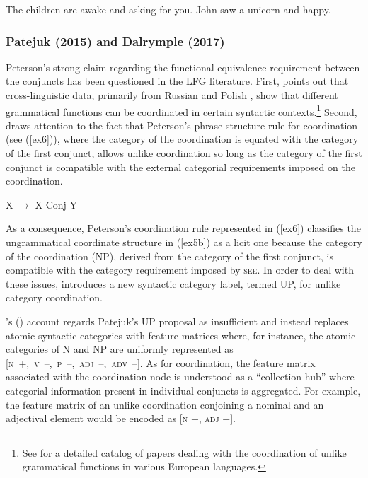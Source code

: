 \pex
\label{ex5}
\a\label{ex5a}The children are awake and asking for you. 
\a\label{ex5b}\ljudge{*}John saw a unicorn and happy. 
\xe

\subsubsection{Patejuk (2015) and Dalrymple (2017)}
Peterson's strong claim regarding the functional equivalence requirement between the conjuncts has been questioned in the LFG literature. First, \citet[ch.\ 5]{pat:15} points out that cross-linguistic data, primarily from Russian \citep{chaves-paperno:2007} and Polish \citep[][pp.\ 2200--2202]{pat:prz:12b}, show that different grammatical functions can be coordinated in certain syntactic contexts.\footnote{See \citet[ch.5]{pat:15} for a detailed catalog of papers dealing with the coordination of unlike grammatical functions in various European languages.} Second, \citet{Dalrymple2017} draws attention to the fact that Peterson's phrase-structure rule for coordination (see (\ref{ex6})), where the category of the coordination is equated with the category of the first conjunct, allows unlike coordination so long as the category of the first conjunct is compatible with the external categorial requirements imposed on the coordination.

\pex
\label{ex6}
X \hspace{5pt} $\longrightarrow$ \hspace{5pt} X \hspace{5pt} Conj \hspace{5pt} Y 
\xe

\noindent As a consequence, Peterson's coordination rule represented in (\ref{ex6}) classifies the ungrammatical coordinate structure in (\ref{ex5b}) as a licit one because the category of the coordination (NP), derived from the category of the first conjunct, is compatible with the category requirement imposed by \textsc{see}. In order to deal with these issues, \citet{pat:15} introduces a new syntactic category label, termed UP, for unlike category coordination. 

\begin{sloppypar}
\citeauthor{Dalrymple2017}'s (\citeyear{Dalrymple2017}) account regards Patejuk's UP proposal as insufficient and instead replaces atomic syntactic categories with feature matrices where, for instance, the atomic categories of N and NP are uniformly represented as \mbox{[\textsc{n} +, \textsc{v} --, \textsc{p} --, \textsc{adj} --, \textsc{adv} --]}. As for coordination, the feature matrix associated with the coordination node is understood as a ``collection hub'' where categorial information present in individual conjuncts is aggregated. For example, the feature matrix of an unlike coordination conjoining a nominal and an adjectival element would be encoded as [\textsc{n} +, \textsc{adj} +]. 
\end{sloppypar}

